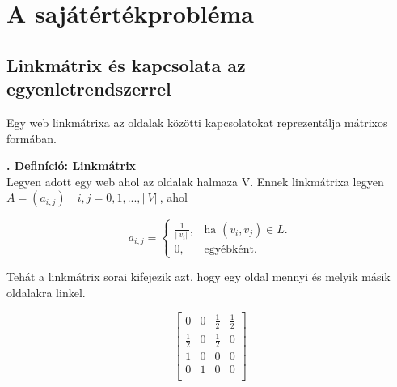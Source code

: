 \documentclass[12pt,a4paper]{article}
\newcounter{definicioszam}
\newenvironment{definicio}[1]
{{\medskip}\noindent \stepcounter{definicioszam}
{\bfseries{\thedefinicioszam. Definíció: #1\\[1ex]}}}{\bigskip }
\begin{document}
\section{A sajátértékprobléma}

\subsection{Linkmátrix és kapcsolata az egyenletrendszerrel}

Egy web linkmátrixa az oldalak közötti kapcsolatokat reprezentálja mátrixos formában.

\begin{definicio}{Linkmátrix}
	Legyen adott egy web ahol az oldalak halmaza V. Ennek linkmátrixa legyen $A = (a_{i,j}) \quad i,j = 0,1,...,|\ V |\ $, ahol
	
	\begin{equation}
	a_{i,j}=\begin{cases}
	\frac{1}{ |\ v_i |\ }, & \text{ha $(v_i,v_j) \in L$}.\\
	0, & \text{egyébként}.
	\end{cases}
	\end{equation}
	
\end{definicio}

Tehát a linkmátrix sorai kifejezik azt, hogy egy oldal mennyi és melyik másik oldalakra linkel. 

\bigskip

\begin{minipage}{0.4\textwidth}
	\begin{center}
	\end{center}
\end{minipage}
\begin{minipage}{0.5\textwidth}
	\begin{center}
		\[
	  \begin{bmatrix}
	  	0 & 0 & \frac{1}{2} & \frac{1}{2} \\  
	  	\frac{1}{2} & 0 & \frac{1}{2} & 0 \\
	  	1 & 0 & 0 & 0 \\
	    0 & 1 & 0 & 0 \\
	  \end{bmatrix}
	  \]
	\end{center}
\end{minipage}
\end{document}
